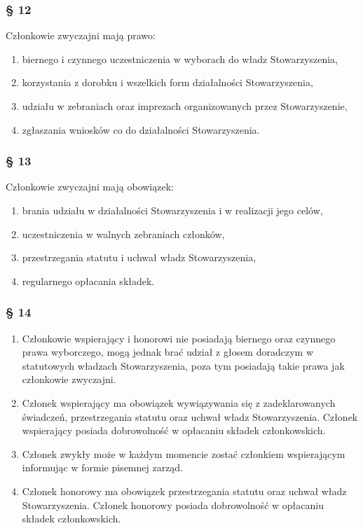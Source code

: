 \documentclass{article}
\newcommand{\myparagraph}[1]{\subsubsection*{#1}}
\begin{document}
\myparagraph{§ 12}
Członkowie zwyczajni mają prawo:
\begin{enumerate}
\item
  biernego i czynnego uczestniczenia w wyborach do władz Stowarzyszenia,
\item
  korzystania z dorobku i wszelkich form działalności Stowarzyszenia,
\item
  udziału w zebraniach oraz imprezach organizowanych przez Stowarzyszenie,
\item
  zgłaszania wniosków co do działalności Stowarzyszenia.
\end{enumerate}

\myparagraph{§ 13}
Członkowie zwyczajni mają obowiązek:
\begin{enumerate}
\item
  brania udziału w działalności Stowarzyszenia i w realizacji jego celów,
\item
  uczestniczenia w walnych zebraniach członków,
\item
  przestrzegania statutu i uchwał władz Stowarzyszenia,
\item
  regularnego opłacania składek.
\end{enumerate}

\myparagraph{§ 14}
\begin{enumerate}
\item
  Członkowie wspierający i honorowi nie posiadają biernego oraz czynnego prawa wyborczego, mogą jednak brać udział z głosem doradczym w statutowych władzach Stowarzyszenia, poza tym posiadają takie prawa jak członkowie zwyczajni.
\item
  Członek wspierający ma obowiązek wywiązywania się z zadeklarowanych świadczeń, przestrzegania statutu oraz uchwał władz Stowarzyszenia.
  Członek wspierający posiada dobrowolność w opłacaniu składek członkowskich.
\item
  Członek zwykły może w każdym momencie zostać członkiem wspierającym informując w formie pisemnej zarząd.
\item
  Członek honorowy ma obowiązek przestrzegania statutu oraz uchwał władz Stowarzyszenia. Członek honorowy posiada dobrowolność w opłacaniu składek członkowskich.
\end{enumerate}
\end{document}
